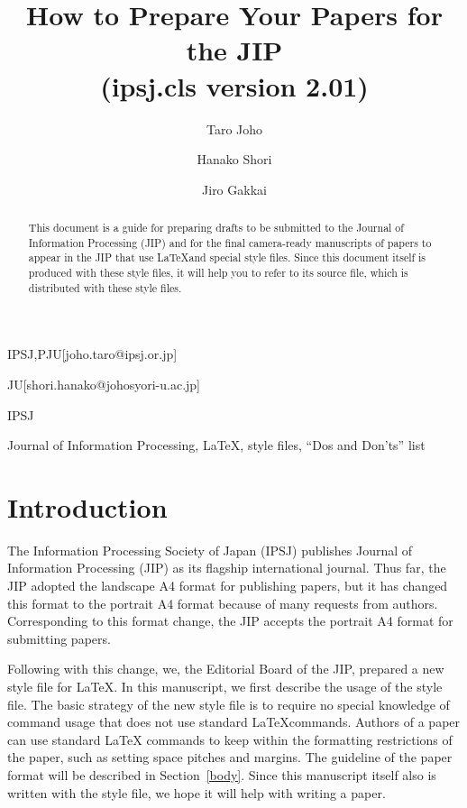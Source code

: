 \documentclass[Japanese,preprint,JIP]{ipsj}
\begin{document}
\title{How to Prepare Your Papers for the JIP\\
(ipsj.cls version 2.01)}


\author{Taro Joho}{IPSJ,PJU}[joho.taro@ipsj.or.jp]
\author{Hanako Shori}{JU}[shori.hanako@johosyori-u.ac.jp]
\author{Jiro Gakkai}{IPSJ}


\begin{abstract}
This document is a guide for preparing drafts to be submitted to the
Journal of Information Processing (JIP) and for the final camera-ready
manuscripts of papers to appear in the JIP that use \LaTeX and special
style files.  Since this document itself is produced with these style
files, it will help you to refer to its source file, which is
distributed with these style files.
\end{abstract}

\begin{keyword}
Journal of Information Processing, \LaTeX, style files, ``Dos and
 Don'ts'' list
\end{keyword}

\maketitle

\section{Introduction}

The Information Processing Society of Japan (IPSJ) publishes Journal of
Information Processing (JIP) as its flagship international journal.
Thus far, the JIP adopted the landscape A4 format for publishing papers,
but it has changed this format to the portrait A4 format because of many
requests from authors.  Corresponding to this format change, the JIP
accepts the portrait A4 format for submitting papers.

Following with this change, we, the Editorial Board of the JIP, prepared
a new style file for \LaTeX\@.  In this manuscript, we first describe
the usage of the style file.  The basic strategy of the new style file
is to require no special knowledge of command usage that does not use
standard \LaTeX commands.  Authors of a paper can use standard \LaTeX
commands to keep within the formatting restrictions of the paper, such
as setting space pitches and margins.  The guideline of the paper format
will be described in Section~\ref{body}.  Since this manuscript itself
also is written with the style file, we hope it will help with writing a
paper.
\end{document}

